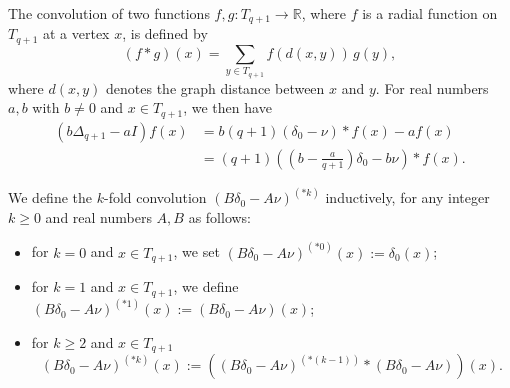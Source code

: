 \documentclass[12pt]{amsart}
\numberwithin{equation}{section}
\theoremstyle{boldremark}
\begin{document}
The convolution of two functions $f, g : T_{q+1} \to \mathbb{R}$, where $f$ is a radial function on $T_{q+1}$ at a vertex $x$, is defined by
\begin{equation}\label{eq. def. conv}
(f \ast g)(x) = \sum_{y \in T_{q+1}} f(d(x,y)) \, g(y),
\end{equation}
where $d(x,y)$ denotes the graph distance between $x$ and $y$.
For real numbers $a,b$ with $b\neq 0$ and $x\in T_{q+1}$, we then have
\begin{align*}
(b\Delta_{q+1}-aI)f(x)&= b(q+1)\left(\delta_0 -\nu \right)\ast f(x)-af(x)\\&= (q+1)\left(\left(b-\frac{a}{q+1}\right) \delta_0 -b\nu \right)\ast f(x).
\end{align*}

We define the $k$-fold convolution $(B\delta_0-A\nu)^{(\ast k)}$ inductively, for any integer $k\geq 0$ and real numbers $A,B$ as follows:
\begin{itemize}
  \item for $k=0$ and $x\in T_{q+1}$, we set $(B\delta_0-A\nu)^{(\ast 0)}(x):=\delta_0(x)$;
  \item for $k=1$ and  $x\in T_{q+1}$, we define  $(B\delta_0-A\nu)^{(\ast 1)}(x):=(B\delta_0-A\nu)(x)$;
\item for $k\geq 2$ and $x\in T_{q+1}$
$$(B\delta_0-A\nu)^{(\ast k)}(x):=((B\delta_0-A\nu)^{(\ast (k-1))} \ast (B\delta_0-A\nu) )(x).$$
\end{itemize}
\end{document}
